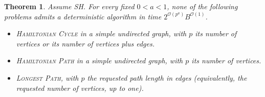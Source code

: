 \documentclass[11pt]{article}
\newtheorem{theorem}{Theorem}
\begin{document}
\hypertarget{hamiltonian-sh-forward}{}
\begin{theorem}
Assume SH. For every fixed \(0<a<1\), none of the following problems
admits a deterministic algorithm in time \(2^{\mathcal O(p^a)}B^{\mathcal O(1)}\).
\begin{itemize}
\item \textsc{Hamiltonian Cycle} in a simple undirected graph, with
\(p\) its number of vertices or its number of vertices plus edges.
\item \textsc{Hamiltonian Path} in a simple undirected graph, with \(p\)
its number of vertices.
\item \textsc{Longest Path}, with \(p\) the requested path length in
edges (equivalently, the requested number of vertices, up to one).
\end{itemize}
\end{theorem}
\end{document}

